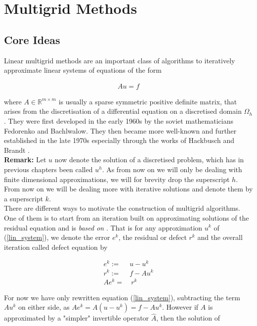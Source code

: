 \documentclass[../draft_1.tex]{subfiles}
\begin{document}
\chapter{Multigrid Methods}

\section{Core Ideas}
Linear multigrid methods are an important class of algorithms to iteratively approximate linear systems of equations of the form
 \begin{ceqn}
 	\begin{align}
 	\label{lin_system}
 Au = f 
 	\end{align}
\end{ceqn}

 where $A \in \mathbb{R}^{m \times m}$ is usually a sparse symmetric positive definite matrix, that arises from the discretisation of a differential equation on a discretised domain $\Omega_h$. They were first developed in the early 1960s by the soviet mathematicians Fedorenko and Bachlwalow. They then became more well-known and further established in the late 1970s especially through the works of Hackbusch \cite{hackbusch2013multi} and Brandt \cite{brandt1977multi}.
\smallskip
\\
\textbf{Remark:} Let $u$ now denote the solution of a discretised problem, which has in previous chapters been called $u^h$. As from now on we will only be dealing with finite dimensional approximations, we will for brevity drop the superscript $h$.  From now on we will be dealing more with iterative solutions and denote them by a superscript $k$. 
\smallskip
\\
There are different ways to motivate the construction of multigrid algorithms. One of them is to start from an iteration built on approximating solutions of the residual equation and is \textit{based on} \cite{trottenberg2000multigrid}. That is for any approximation $u^k$ of (\ref{lin_system}), we denote the error $e^k$, the residual or defect $r^k$ and the overall iteration called defect equation by
\begin{ceqn}
	\begin{align}
	e^k :=& u - u^k \\
	r^k :=& f - Au^k \\
	\label{defect_equation}
	A e^k =& \ r^k	
	\end{align}
\end{ceqn}
For now we have only rewritten equation (\ref{lin_system}), subtracting the term $Au^k$ on either side, as $A e^k = A( u - u^k) = f - Au^k$. However if $A$ is approximated by a "simpler" invertible operator $\hat{A}$, then the solution of 
\end{document}

